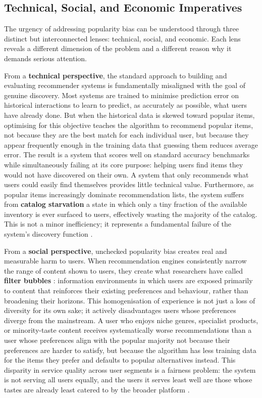 \documentclass[11pt,a4paper]{report}
\begin{document}
\subsection{Technical, Social, and Economic Imperatives}

The urgency of addressing popularity bias can be understood through three distinct but interconnected lenses: technical, social, and economic. Each lens reveals a different dimension of the problem and a different reason why it demands serious attention.

From a \textbf{technical perspective}, the standard approach to building and evaluating recommender systems is fundamentally misaligned with the goal of genuine discovery. Most systems are trained to minimise prediction error on historical interactions to learn to predict, as accurately as possible, what users have already done. But when the historical data is skewed toward popular items, optimising for this objective teaches the algorithm to recommend popular items, not because they are the best match for each individual user, but because they appear frequently enough in the training data that guessing them reduces average error. The result is a system that scores well on standard accuracy benchmarks while simultaneously failing at its core purpose: helping users find items they would not have discovered on their own. A system that only recommends what users could easily find themselves provides little technical value. Furthermore, as popular items increasingly dominate recommendation lists, the system suffers from \textbf{catalog starvation} a state in which only a tiny fraction of the available inventory is ever surfaced to users, effectively wasting the majority of the catalog. This is not a minor inefficiency; it represents a fundamental failure of the system's discovery function \citep{steck2011itempopularity}.

From a \textbf{social perspective}, unchecked popularity bias creates real and measurable harm to users. When recommendation engines consistently narrow the range of content shown to users, they create what researchers have called \textbf{filter bubbles} \citep{pariser2011filterbubble} : information environments in which users are exposed primarily to content that reinforces their existing preferences and behaviour, rather than broadening their horizons. This homogenisation of experience is not just a loss of diversity for its own sake; it actively disadvantages users whose preferences diverge from the mainstream. A user who enjoys niche genres, specialist products, or minority-taste content receives systematically worse recommendations than a user whose preferences align with the popular majority not because their preferences are harder to satisfy, but because the algorithm has less training data for the items they prefer and defaults to popular alternatives instead. This disparity in service quality across user segments is a fairness problem: the system is not serving all users equally, and the users it serves least well are those whose tastes are already least catered to by the broader platform \citep{abdollahpouri2021usercentered}.
\end{document}

